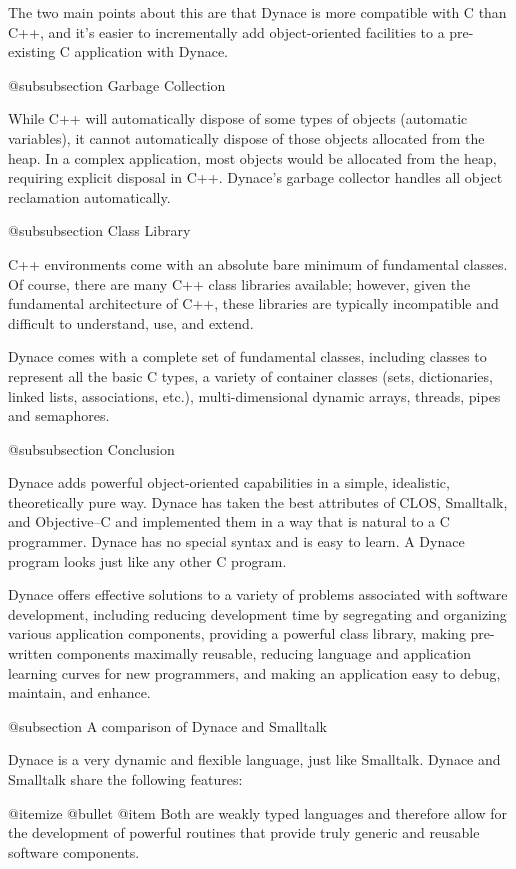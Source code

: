 The two main points about this are that Dynace is more compatible with
C than C++, and it's easier to incrementally add object-oriented
facilities to a pre-existing C application with Dynace.


@subsubsection Garbage Collection

While C++ will automatically dispose of some types of objects (automatic
variables), it cannot automatically dispose of those objects allocated
from the heap.  In a complex application, most objects would be allocated
from the heap, requiring explicit disposal in C++.  Dynace's garbage collector
handles all object reclamation automatically.


@subsubsection Class Library

C++ environments come with an absolute bare minimum of fundamental classes.
Of course, there are many C++ class libraries available; however, given
the fundamental architecture of C++, these libraries are typically
incompatible and difficult to understand, use, and extend.

Dynace comes with a complete set of fundamental classes, including classes
to represent all the basic C types, a variety of container classes (sets,
dictionaries, linked lists, associations, etc.), multi-dimensional dynamic
arrays, threads, pipes and semaphores.


@subsubsection Conclusion


Dynace adds powerful object-oriented capabilities in a simple,
idealistic, theoretically pure way.  Dynace has taken the best
attributes of CLOS, Smalltalk, and Objective--C and implemented them in a
way that is natural to a C programmer.  Dynace has no special syntax
and is easy to learn.  A Dynace program looks just like any other C
program.

Dynace offers effective solutions to a variety of problems associated
with software development, including reducing development time by
segregating and organizing various application components, providing a
powerful class library, making pre-written components maximally
reusable, reducing language and application learning curves for new
programmers, and making an application easy to debug, maintain, and
enhance.



@subsection A comparison of Dynace and Smalltalk


Dynace is a very dynamic and flexible language, just like
Smalltalk.  Dynace and Smalltalk share the following features:

@itemize @bullet
@item
Both are weakly typed languages and therefore allow
for the development of powerful routines that provide truly generic
and reusable software components.

